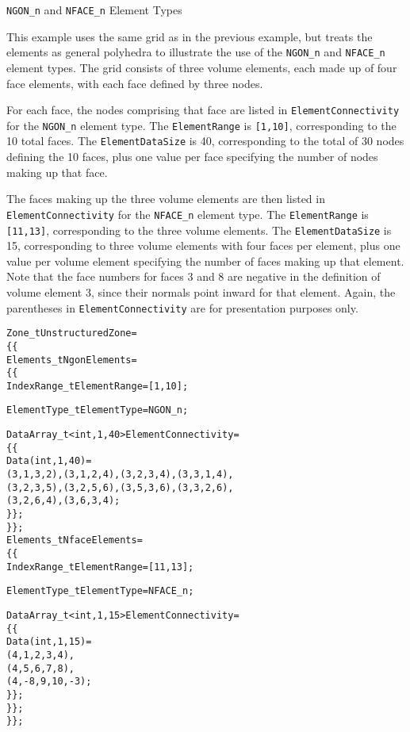 \begin{example}{\texttt{NGON\_n} and \texttt{NFACE\_n} Element Types}
\label{ex:elements2}

This example uses the same grid as in the previous example, but
treats the elements as general polyhedra to illustrate the use of the
\texttt{NGON\_n} and \texttt{NFACE\_n} element types.
The grid consists of three volume elements, each made up of four face
elements, with each face defined by three nodes.

For each face, the nodes comprising that face are listed in
\texttt{ElementConnectivity} for the \texttt{NGON\_n} element type.
The \texttt{ElementRange} is \texttt{[1,10]}, corresponding to the 10
total faces.
The \texttt{ElementDataSize} is 40, corresponding to the total of 30
nodes defining the 10 faces, plus one value per face specifying the
number of nodes making up that face.

The faces making up the three volume elements are then listed in
\texttt{ElementConnectivity} for the \texttt{NFACE\_n} element type.
The \texttt{ElementRange} is \texttt{[11,13]}, corresponding to the three
volume elements.
The \texttt{ElementDataSize} is 15, corresponding to three volume
elements with four faces per element, plus one value per volume element
specifying the number of faces making up that element.
Note that the face numbers for faces 3 and 8 are negative in the
definition of volume element 3, since their normals point inward for
that element.
Again, the parentheses in \texttt{ElementConnectivity} are for
presentation purposes only.
\begin{alltt}
  Zone\_t UnstructuredZone =
    \{\{
    Elements\_t NgonElements =
      \{\{
      IndexRange\_t ElementRange = [1,10] ;

      ElementType\_t ElementType = NGON\_n ;

      DataArray\_t<int, 1, 40> ElementConnectivity =
        \{\{
        Data(int, 1, 40) =
          (3, 1, 3, 2), (3, 1, 2, 4), (3, 2, 3, 4), (3, 3, 1, 4),
          (3, 2, 3, 5), (3, 2, 5, 6), (3, 5, 3, 6), (3, 3, 2, 6),
          (3, 2, 6, 4), (3, 6, 3, 4) ;
        \}\} ;
      \}\} ;
    Elements\_t NfaceElements =
      \{\{
      IndexRange\_t ElementRange = [11,13] ;

      ElementType\_t ElementType = NFACE\_n ;

      DataArray\_t<int, 1, 15> ElementConnectivity =
        \{\{
        Data(int, 1, 15) =
          (4,  1,  2,  3,  4),
          (4,  5,  6,  7,  8),
          (4, -8,  9, 10, -3) ;
        \}\} ;
      \}\} ;
    \}\} ;
\end{alltt}
\end{example}

